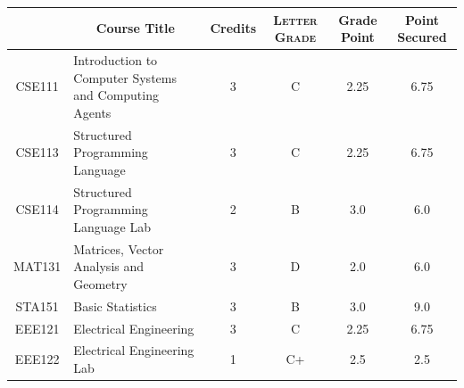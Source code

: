 \documentclass[11pt]{article}
\newcommand*{\numtwo}[1]{\pgfmathprintnumber[
                    fixed, precision=2, fixed zerofill=true]{#1}}
\begin{document}
                \begin{center}
                    \renewcommand{\arraystretch}{1.08}
                    
                \begin{tabular}{|c|l|c|>{\scshape}c|c|c|}
                \hline  \rule[-1ex]{0pt}{3.5ex} {\centering{\bf Course Code}} &  \multicolumn{1}{c|}{\textbf{Course Title}}  & {\bf Credits} & {\bf Letter Grade} & {\bf Grade Point} & {\bf Point Secured}  \\ 
                \hline   CSE111 &  Introduction to Computer Systems and Computing Agents		 & 3 & C & 2.25 & 6.75 \\ %
                \hline   CSE113 &  Structured Programming Language		 & 3 & C & 2.25 & 6.75 \\ %
                \hline   CSE114 &  Structured Programming Language Lab		 & 2 & B & 3.0 & 6.0 \\ %
                \hline   MAT131 &  Matrices, Vector Analysis and Geometry		 & 3 & D & 2.0 & 6.0 \\ %
                \hline   STA151 &  Basic Statistics		 & 3 & B & 3.0 & 9.0 \\ %
                \hline   EEE121 &  Electrical Engineering		 & 3 & C & 2.25 & 6.75 \\ %
                \hline   EEE122 &  Electrical Engineering Lab		 & 1 & C+ & 2.5 & 2.5 \\ %

\hline                %
                \end{tabular}
                \end{center}
                \renewcommand{\arraystretch}{1.03}
\end{document}
